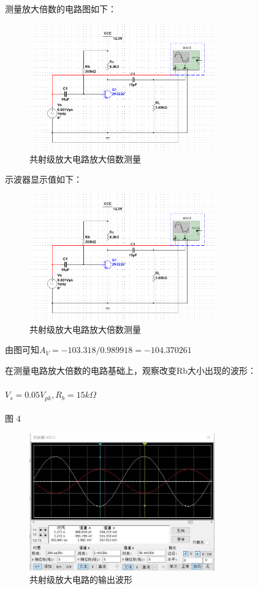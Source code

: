 \documentclass[10pt, conference, compsocconf, a4paper]{IEEEtran}
\begin{document}
测量放大倍数的电路图如下：\par

\begin{figure}[h]
  \includegraphics[width=8cm]{img/b.png}
  \caption{共射级放大电路放大倍数测量}
\end{figure}

示波器显示值如下：\par

\begin{figure}[h]
  \includegraphics[width=8cm]{img/b.png}
  \caption{共射级放大电路放大倍数测量}
\end{figure}

由图可知$A_V = -103.318 / 0.989918 = -104.370261$ \par
在测量电路放大倍数的电路基础上，观察改变Rb大小出现的波形：\par

\paragraph{$V_s = 0.05V_{pk} , R_b = 15k\Omega$}图 4

\begin{figure}[H]%
  \includegraphics[width=8cm]{img/c.png}
  \caption{共射级放大电路的输出波形}
\end{figure}
\end{document}
